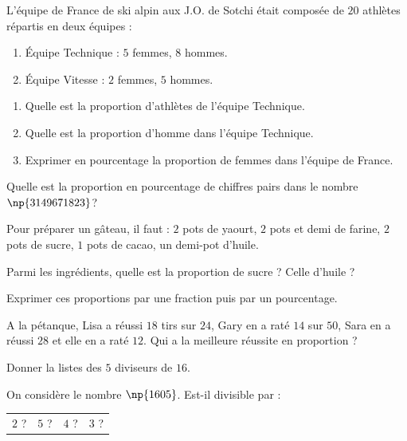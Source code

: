 \documentclass[a4paper,10pt]{report}
\begin{document}
\begin{ex}
L'équipe de France de ski alpin aux J.O. de Sotchi était composée de $20$ athlètes répartis en deux équipes :
\begin{enumerate}[font=\color{exer1}]
\item[•]Équipe Technique : $5$ femmes, $8$ hommes.
\item[•]Équipe Vitesse : $2$ femmes, $5$ hommes.
\end{enumerate}
\begin{enumerate}[font=\color{exer1}]
\item Quelle est la proportion d'athlètes de l'équipe Technique.
\item Quelle est la proportion d'homme dans l'équipe Technique.
\item Exprimer en pourcentage la proportion de femmes dans l'équipe de France.
\end{enumerate}
\end{ex}

\begin{ex}
Quelle est la proportion en pourcentage de chiffres pairs dans le nombre $\np{3149671823}$?
\end{ex}

\begin{ex}
Pour préparer un gâteau, il faut : $2$ pots de yaourt, $2$ pots et demi de farine, $2$ pots de sucre, $1$ pots de cacao, un demi-pot d'huile.

\noindent Parmi les ingrédients, quelle est la proportion de sucre ? Celle d'huile ?

\noindent Exprimer ces proportions par une fraction puis par un pourcentage.
\end{ex}

\begin{ex}
A la pétanque, Lisa a réussi $18$ tirs sur $24$, Gary en a raté $14$ sur $50$, Sara en a réussi $28$ et elle en a raté $12$. Qui a la meilleure réussite en proportion ?
\end{ex}


\begin{ex}
Donner la listes des $5$ diviseurs de $16$.
\end{ex}

\begin{ex}
On considère le nombre $\np{1605}$. Est-il divisible par :
\begin{enumerate}[font=\color{exer1}]
\begin{tabular}{m{1.1cm}m{1.1cm}m{1.1cm}m{1.1cm}}
\item $2$ ?&
\item $5$ ?&
\item $4$ ?&
\item $3$ ?\\
\end{tabular}
\end{enumerate}
\end{ex}
\end{document}
